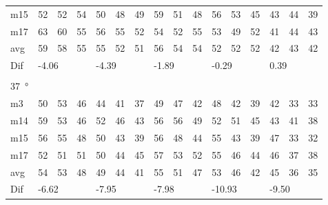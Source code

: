 \begin{table}[H]
\begin{tabular}{l|l|l|l|l|l|l|l|l|l|l|l|l|lll}
m15  &  52    & 52     &   54   &  50    &  48    &  49    & 59     &    51   &   48   &   56    &   53   &   45   & \multicolumn{1}{l|}{43} & \multicolumn{1}{l|}{44} & 39 \\
m17  &  63    & 60     &  55    &  56    & 55     &  52    &  54    &   52    &    55  &   53    &   49   & 52     & \multicolumn{1}{l|}{41} & \multicolumn{1}{l|}{44} & 43 \\ \hline
avg & 59     & 58     &  55    &  55    &  52    &  51    &  56    &   54    & 54     &    52   &   52   &  52    & \multicolumn{1}{l|}{42} & \multicolumn{1}{l|}{43}  & 42  \\ \hline  
Dif & \multicolumn{3}{l|}{-4.06} & \multicolumn{3}{l|}{-4.39} & \multicolumn{3}{l|}{-1.89} & \multicolumn{3}{l|}{-0.29} & \multicolumn{3}{l}{0.39} \\ 
 \multicolumn{16}{l}{ } \\                             
\SI{37}{\degree}   & \multicolumn{3}{l|}{} & \multicolumn{3}{l|}{} & \multicolumn{3}{l|}{} & \multicolumn{3}{l|}{} & \multicolumn{3}{l}{}   \\  \hline
m3    & 50     &  53    &  46    &  44    &  41    &  37    &  49    &   47    &   42   &   48    &  42    &   39   & \multicolumn{1}{l|}{42} & \multicolumn{1}{l|}{33} &33  \\
m14  & 59     &  53    &  46    &  52    &   46   &  43    &  56    &  56     &  49    &   52    &   51   &   45   & \multicolumn{1}{l|}{43} & \multicolumn{1}{l|}{41} & 38 \\
m15  &  56    &  55    &  48    &   50   &   43   &   39   &   56   &  48     & 44     &    55   &   43   &   39   & \multicolumn{1}{l|}{47} & \multicolumn{1}{l|}{33} & 32 \\
m17  & 52     &  51    &  51    &  50    &  44    &    45  &   57   &   53    &  52    &  55     &  46    &   44   & \multicolumn{1}{l|}{46} & \multicolumn{1}{l|}{37} &  38\\ \hline
avg &  54    & 53     &  48    &  49    &  44    &  41    &  55    &   51    &  47    &   53    &   46   &  42    & \multicolumn{1}{l|}{45} & \multicolumn{1}{l|}{36}  & 35 \\ \hline  
Dif & \multicolumn{3}{l|}{-6.62} & \multicolumn{3}{l|}{-7.95} & \multicolumn{3}{l|}{-7.98} & \multicolumn{3}{l|}{-10.93} & \multicolumn{3}{l}{-9.50}                        
\end{tabular}
\end{table}


